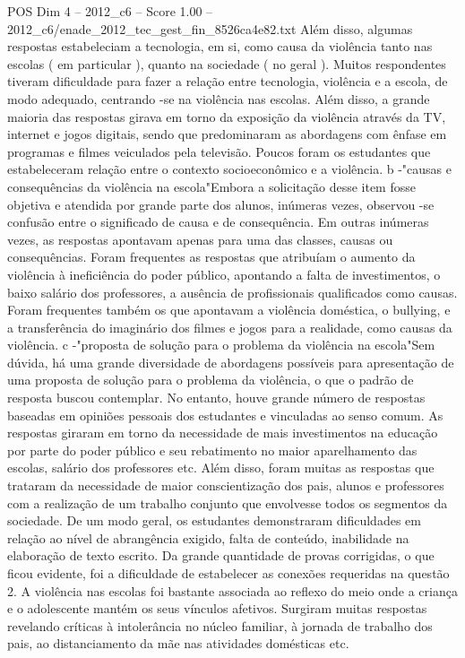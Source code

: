 \begin{textsample}{POS Dim 4 – 2012\_c6 – Score 1.00 – 2012\_c6/enade\_2012\_tec\_gest\_fin\_8526ca4e82.txt}
Além disso, algumas respostas estabeleciam a tecnologia, em si, como causa da violência tanto nas escolas ( em particular ), quanto na sociedade ( no geral ).
Muitos respondentes tiveram dificuldade para fazer a relação entre tecnologia, violência e a escola, de modo adequado, centrando -se na violência nas escolas.
Além disso, a grande maioria das respostas girava em torno da exposição da violência através da TV, internet e jogos digitais, sendo que predominaram as abordagens com ênfase em programas e filmes veiculados pela televisão.
Poucos foram os estudantes que estabeleceram relação entre o contexto socioeconômico e a violência. b -"causas e consequências da violência na escola"Embora a solicitação desse item fosse objetiva e atendida por grande parte dos alunos, inúmeras vezes, observou -se confusão entre o significado de causa e de consequência.
Em outras inúmeras vezes, as respostas apontavam apenas para uma das classes, causas ou consequências.
Foram frequentes as respostas que atribuíam o aumento da violência à ineficiência do poder público, apontando a falta de investimentos, o baixo salário dos professores, a ausência de profissionais qualificados como causas.
Foram frequentes também os que apontavam a violência doméstica, o bullying, e a transferência do imaginário dos filmes e jogos para a realidade, como causas da violência. c -"proposta de solução para o problema da violência na escola"Sem dúvida, há uma grande diversidade de abordagens possíveis para apresentação de uma proposta de solução para o problema da violência, o que o padrão de resposta buscou contemplar.
No entanto, houve grande número de respostas baseadas em opiniões pessoais dos estudantes e vinculadas ao senso comum.
As respostas giraram em torno da necessidade de mais investimentos na educação por parte do poder público e seu rebatimento no maior aparelhamento das escolas, salário dos professores etc.
Além disso, foram muitas as respostas que trataram da necessidade de maior conscientização dos pais, alunos e professores com a realização de um trabalho conjunto que envolvesse todos os segmentos da sociedade.
De um modo geral, os estudantes demonstraram dificuldades em relação ao nível de abrangência exigido, falta de conteúdo, inabilidade na elaboração de texto escrito.
Da grande quantidade de provas corrigidas, o que ficou evidente, foi a dificuldade de estabelecer as conexões requeridas na questão 2.
A violência nas escolas foi bastante associada ao reflexo do meio onde a criança e o adolescente mantém os seus vínculos afetivos.
Surgiram muitas respostas revelando críticas à intolerância no núcleo familiar, à jornada de trabalho dos pais, ao distanciamento da mãe nas atividades domésticas etc.

\end{textsample}
